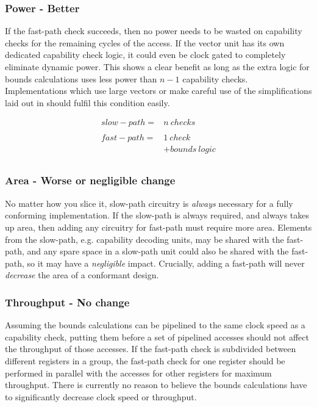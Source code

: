 \subsubsection*{Power - Better}
If the fast-path check succeeds, then no power needs to be wasted on capability checks for the remaining cycles of the access.
If the vector unit has its own dedicated capability check logic, it could even be clock gated to completely eliminate dynamic power.
This shows a clear benefit as long as the extra logic for bounds calculations uses less power than $n - 1$ capability checks.
Implementations which use large vectors or make careful use of the simplifications laid out in  should fulfil this condition easily.

\begin{equation}
\begin{array}{lr}
    \mathit{slow-path} =& n\ \mathit{checks} \\
&\\
    \mathit{fast-path} =& 1\ \mathit{check} \\
     &+ \mathit{bounds}\ \mathit{logic} \\

\end{array}
\end{equation}

\subsubsection*{Area - Worse or negligible change}
No matter how you slice it, slow-path circuitry is \emph{always} necessary for a fully conforming implementation.
If the slow-path is always required, and always takes up area, then adding any circuitry for fast-path must require more area.
Elements from the slow-path, e.g. capability decoding units, may be shared with the fast-path, and any spare space in a slow-path unit could also be shared with the fast-path, so it may have a \emph{negligible} impact.
Crucially, adding a fast-path will never \emph{decrease} the area of a conformant design.

\subsubsection*{Throughput - No change}
Assuming the bounds calculations can be pipelined to the same clock speed as a capability check, putting them before a set of pipelined accesses should not affect the throughput of those accesses.
If the fast-path check is subdivided between different registers in a group, the fast-path check for one register should be performed in parallel with the accesses for other registers for maximum throughput.
There is currently no reason to believe the bounds calculations have to significantly decrease clock speed or throughput.

